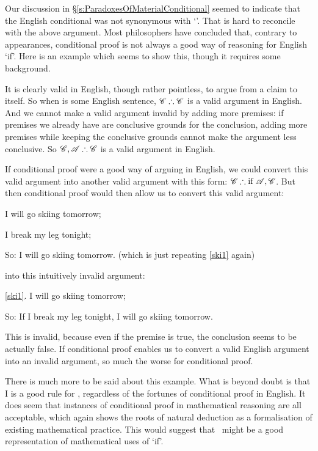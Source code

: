 Our discussion in §\ref{s:ParadoxesOfMaterialConditional} seemed to indicate that the English conditional was not synonymous with `\eif'. That is hard to reconcile with the above argument. Most philosophers have concluded that, contrary to appearances, conditional proof is not always a good way of reasoning for English `if'. Here is an example which seems to show this, though it requires some background.

It is clearly valid in English, though rather pointless, to argue from a claim to itself. So when  is some English sentence, $\mathscr{C} \mathrel{\therefore} \mathscr{C}$ is a valid argument in English. And we cannot make a valid argument invalid by adding more premises:  if premises we already have are conclusive grounds for the conclusion, adding more premises while keeping the conclusive grounds cannot make the argument less conclusive. So $\mathscr{C},\mathscr{A} \mathrel{\therefore} \mathscr{C}$ is a valid argument in English. 

If conditional proof were a good way of arguing in English, we could convert this valid argument into another valid argument with this form: $\mathscr{C} \mathrel{\therefore} \text{if }\mathscr{A}, \mathscr{C}$. But then conditional proof would then allow us to convert this valid argument: \begin{earg}
	\item[\ex{ski1}] I will go skiing tomorrow;
	\item[\ex{ski2}] I break my leg tonight;
	\item[So:] I will go skiing tomorrow. \qquad(which is just repeating \ref{ski1} again)
\end{earg} into this intuitively invalid argument:
\begin{earg}
	\item[\ref{ski1}.] I will go skiing tomorrow;
	\item[So:] If I break my leg tonight, I will go skiing tomorrow.
\end{earg} This is invalid, because even if the premise is true, the conclusion seems to be actually false. If conditional proof enables us to convert a valid English argument into an invalid argument, so much the worse for conditional proof. 

There is much more to be said about this example. What is beyond doubt is that {\eif}I is a good rule for \TFL, regardless of the fortunes of conditional proof in English. It does seem that instances of conditional proof in mathematical reasoning are all acceptable, which again shows the roots of natural deduction as a formalisation of existing mathematical practice. This would suggest that \eif\ might be a good representation of mathematical uses of `if'.


